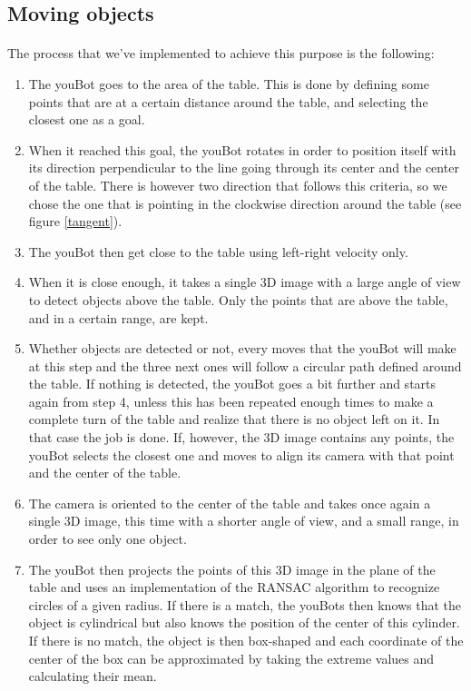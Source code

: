 \documentclass[12pt,a4paper]{article}
\begin{document}
\subsection{Moving objects}

\paragraph{} 
The process that we've implemented to achieve this purpose is the following:
\begin{enumerate}
\item The youBot goes to the area of the table. This is done by defining some points that are at a certain distance around the table, and selecting the closest one as a goal.
\item When it reached this goal, the youBot rotates in order to position itself with its direction perpendicular to the line going through its center and the center of the table. There is however two direction that follows this criteria, so we chose the one that is pointing in the clockwise direction around the table (see figure \ref{tangent}).
\item The youBot then get close to the table using left-right velocity only.
\item When it is close enough, it takes a single 3D image with a large angle of view to detect objects above the table. Only the points that are above the table, and in a certain range, are kept.
\item Whether objects are detected or not, every moves that the youBot will make at this step and the three next ones will follow a circular path defined around the table. If nothing is detected, the youBot goes a bit further and starts again from step 4, unless this has been repeated enough times to make a complete turn of the table and realize that there is no object left on it. In that case the job is done. If, however, the 3D image contains any points, the youBot selects the closest one and moves to align its camera with that point and the center of the table.
\item The camera is oriented to the center of the table and takes once again a single 3D image, this time with a shorter angle of view, and a small range, in order to see only one object.
\item The youBot then projects the points of this 3D image in the plane of the table and uses an implementation of the RANSAC algorithm\cite{RANSAC} to recognize circles of a given radius. If there is a match, the youBots then knows that the object is cylindrical but also knows the position of the center of this cylinder. If there is no match, the object is then box-shaped and each coordinate of the center of the box can be approximated by taking the extreme values and calculating their mean. 

\end{enumerate}
\end{document}
